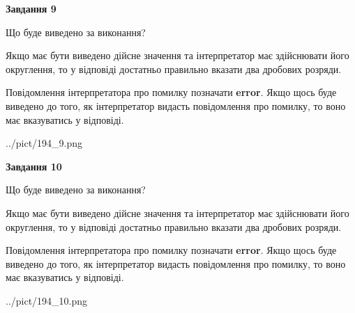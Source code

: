 \documentclass[12pt, ukrainian]{article}
\begin{document}
{\begin {Large}
{\begin {center}\textbf{Завдання 9}\end {center}}\par
Що буде виведено за виконання? \par

Якщо має бути виведено дійсне значення та інтерпретатор має здійснювати його округлення, 
то у відповіді достатньо правильно вказати два дробових розряди.

Повідомлення інтерпретатора про помилку позначати \textbf{error}.
Якщо щось буде виведено до того, як інтерпретатор видасть повідомлення про помилку, 
то воно має вказуватись у відповіді. \par

\begin{center}
	{../pict/194_9.png}
\end{center}
\newpage

{\begin {center}\textbf{Завдання 10}\end {center}}\par
Що буде виведено за виконання? \par

Якщо має бути виведено дійсне значення та інтерпретатор має здійснювати його округлення, 
то у відповіді достатньо правильно вказати два дробових розряди.

Повідомлення інтерпретатора про помилку позначати \textbf{error}.
Якщо щось буде виведено до того, як інтерпретатор видасть повідомлення про помилку, 
то воно має вказуватись у відповіді. \par

\begin{center}
	{../pict/194_10.png}
\end{center}
\newpage

\end {Large}}
\end{document}
